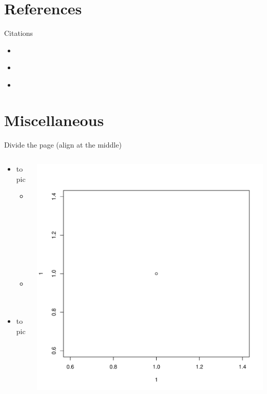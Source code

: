 \documentclass[table]{beamer}
\begin{document}
\section{References}
\label{sec:orge5ade68}

\begin{frame}[label={sec:orge108de5}]{Citations}
\begin{itemize}
\item \citep{pearson1905problem}
\item \cite{pearson1905problem}
\item \citep[xx]{pearson1905problem}
\end{itemize}
\cite[p.~150]{pearson1905problem}
\end{frame}

\section{Miscellaneous}
\label{sec:org0479b17}

\begin{frame}[label={sec:org9b88869}]{Divide the page (align at the middle)}
\begin{columns}
\begin{column}{0.45\columnwidth}
\begin{itemize}
\item topic
\begin{itemize}
\item subtopic
\item sub
\end{itemize}
\item topic
\end{itemize}
\end{column}

\begin{column}{0.45\columnwidth}
\begin{center}
\includegraphics[width=.9\linewidth]{./figures/myplot.pdf}
\end{center}
\end{column}
\end{columns}
\end{frame}
\end{document}

